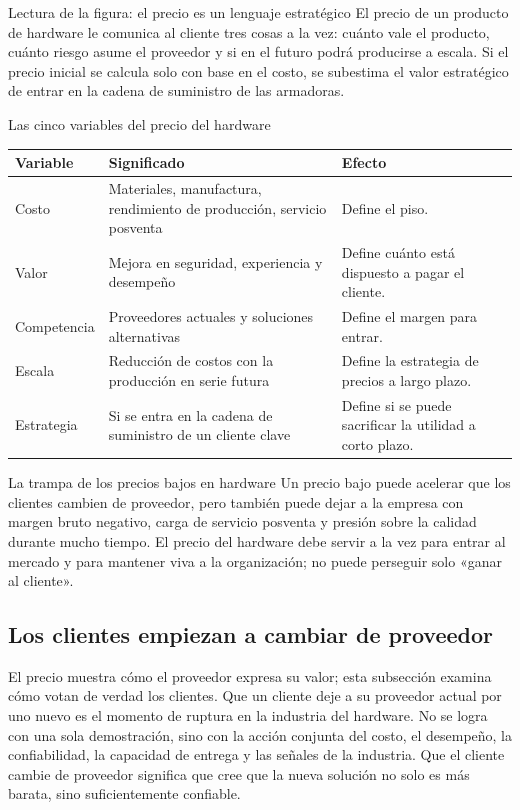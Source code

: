 \documentclass[a4paper]{article}
\begin{document}
\begin{knowledgebox}{Lectura de la figura: el precio es un lenguaje estratégico}
El precio de un producto de hardware le comunica al cliente tres cosas a la vez: cuánto vale el producto, cuánto riesgo asume el proveedor y si en el futuro podrá producirse a escala. Si el precio inicial se calcula solo con base en el costo, se subestima el valor estratégico de entrar en la cadena de suministro de las armadoras.
\end{knowledgebox}

\begin{knowledgebox}{Las cinco variables del precio del hardware}
\begin{tabularx}{\textwidth}{p{}p{}X}
\toprule
Variable & Significado & Efecto \\
\midrule
Costo & Materiales, manufactura, rendimiento de producción, servicio posventa & Define el piso. \\
Valor & Mejora en seguridad, experiencia y desempeño & Define cuánto está dispuesto a pagar el cliente. \\
Competencia & Proveedores actuales y soluciones alternativas & Define el margen para entrar. \\
Escala & Reducción de costos con la producción en serie futura & Define la estrategia de precios a largo plazo. \\
Estrategia & Si se entra en la cadena de suministro de un cliente clave & Define si se puede sacrificar la utilidad a corto plazo. \\
\bottomrule
\end{tabularx}
\end{knowledgebox}

\begin{warningbox}{La trampa de los precios bajos en hardware}
Un precio bajo puede acelerar que los clientes cambien de proveedor, pero también puede dejar a la empresa con margen bruto negativo, carga de servicio posventa y presión sobre la calidad durante mucho tiempo. El precio del hardware debe servir a la vez para entrar al mercado y para mantener viva a la organización; no puede perseguir solo «ganar al cliente».
\end{warningbox}

\subsection{Los clientes empiezan a cambiar de proveedor}

El precio muestra cómo el proveedor expresa su valor; esta subsección examina cómo votan de verdad los clientes. Que un cliente deje a su proveedor actual por uno nuevo es el momento de ruptura en la industria del hardware. No se logra con una sola demostración, sino con la acción conjunta del costo, el desempeño, la confiabilidad, la capacidad de entrega y las señales de la industria. Que el cliente cambie de proveedor significa que cree que la nueva solución no solo es más barata, sino suficientemente confiable.
\end{document}

